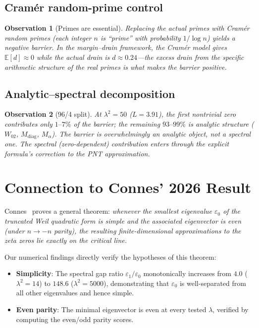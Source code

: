 \documentclass[11pt,a4paper]{article}
\newtheorem{observation}{Observation}[section]
\begin{document}
\subsection{Cram\'er random-prime control}

\begin{observation}[Primes are essential]
Replacing the actual primes with Cram\'er random primes (each integer $n$ is ``prime'' with probability $1/\log n$) yields a \emph{negative} barrier. In the margin--drain framework, the Cram\'er model gives $\mathbb{E}[d] \approx 0$ while the actual drain is $d \approx 0.24$---the excess drain from the specific arithmetic structure of the real primes is what makes the barrier positive.
\end{observation}

\subsection{Analytic--spectral decomposition}

\begin{observation}[96/4 split]
At $\lambda^2 = 50$ ($L = 3.91$), the first nontrivial zero contributes only $1\text{--}7\%$ of the barrier; the remaining $93\text{--}99\%$ is analytic structure ($W_{02}$, $M_{\mathrm{diag}}$, $M_\alpha$). The barrier is overwhelmingly an analytic object, not a spectral one. The spectral (zero-dependent) contribution enters through the explicit formula's correction to the PNT approximation.
\end{observation}

\section{Connection to Connes' 2026 Result}

Connes~\cite{Connes2026} proves a general theorem: \emph{whenever the smallest eigenvalue $\varepsilon_0$ of the truncated Weil quadratic form is simple and the associated eigenvector is even (under $n \to -n$ parity), the resulting finite-dimensional approximations to the zeta zeros lie exactly on the critical line.}

Our numerical findings directly verify the hypotheses of this theorem:

\begin{itemize}
\item \textbf{Simplicity}: The spectral gap ratio $\varepsilon_1/\varepsilon_0$ monotonically increases from $4.0$ ($\lambda^2=14$) to $148.6$ ($\lambda^2=5000$), demonstrating that $\varepsilon_0$ is well-separated from all other eigenvalues and hence simple.
\item \textbf{Even parity}: The minimal eigenvector is even at every tested $\lambda$, verified by computing the even/odd parity scores.
\end{itemize}
\end{document}
